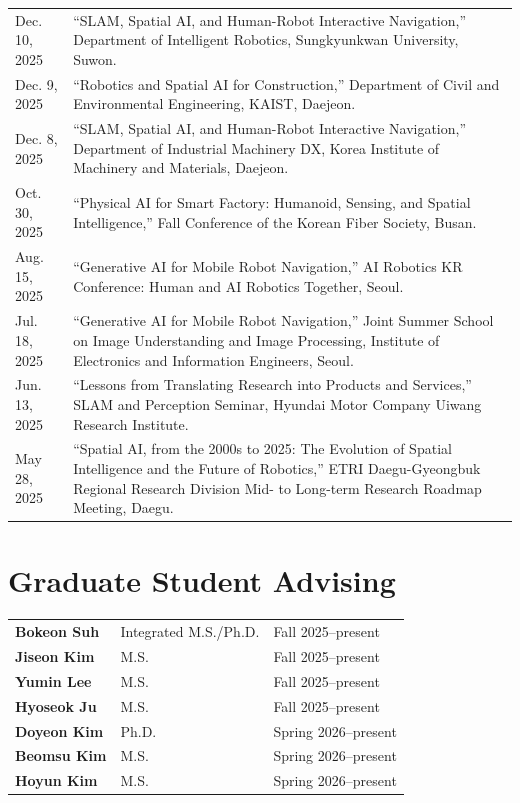 \documentclass[10pt,a4paper]{article}
\newcommand{\daterow}[2]{#1 & #2 \\[2.2pt]}
\begin{document}
\begin{longtable}{@{}L{32mm}L{135mm}@{}}
\daterow{Dec. 10, 2025}{``SLAM, Spatial AI, and Human-Robot Interactive Navigation,'' Department of Intelligent Robotics, Sungkyunkwan University, Suwon.}
\daterow{Dec. 9, 2025}{``Robotics and Spatial AI for Construction,'' Department of Civil and Environmental Engineering, KAIST, Daejeon.}
\daterow{Dec. 8, 2025}{``SLAM, Spatial AI, and Human-Robot Interactive Navigation,'' Department of Industrial Machinery DX, Korea Institute of Machinery and Materials, Daejeon.}
\daterow{Oct. 30, 2025}{``Physical AI for Smart Factory: Humanoid, Sensing, and Spatial Intelligence,'' Fall Conference of the Korean Fiber Society, Busan.}
\daterow{Aug. 15, 2025}{``Generative AI for Mobile Robot Navigation,'' AI Robotics KR Conference: Human and AI Robotics Together, Seoul.}
\daterow{Jul. 18, 2025}{``Generative AI for Mobile Robot Navigation,'' Joint Summer School on Image Understanding and Image Processing, Institute of Electronics and Information Engineers, Seoul.}
\daterow{Jun. 13, 2025}{``Lessons from Translating Research into Products and Services,'' SLAM and Perception Seminar, Hyundai Motor Company Uiwang Research Institute.}
\daterow{May 28, 2025}{``Spatial AI, from the 2000s to 2025: The Evolution of Spatial Intelligence and the Future of Robotics,'' ETRI Daegu-Gyeongbuk Regional Research Division Mid- to Long-term Research Roadmap Meeting, Daegu.}
\end{longtable}

\section{Graduate Student Advising}
\begin{tabularx}{\textwidth}{@{}L{34mm}L{40mm}Y@{}}
\textbf{Bokeon Suh} & Integrated M.S./Ph.D. & Fall 2025--present \\[2pt]
\textbf{Jiseon Kim} & M.S. & Fall 2025--present \\[2pt]
\textbf{Yumin Lee} & M.S. & Fall 2025--present \\[2pt]
\textbf{Hyoseok Ju} & M.S. & Fall 2025--present \\[2pt]
\textbf{Doyeon Kim} & Ph.D. & Spring 2026--present \\[2pt]
\textbf{Beomsu Kim} & M.S. & Spring 2026--present \\[2pt]
\textbf{Hoyun Kim} & M.S. & Spring 2026--present \\[2pt]
\end{tabularx}
\end{document}
